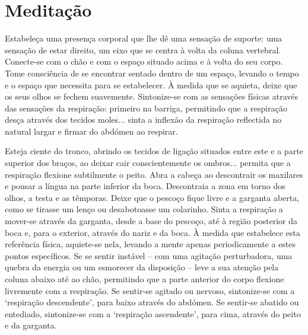 
\chapter{Meditação}


Estabeleça uma presença corporal que lhe dê uma sensação de suporte: uma sensação de estar direito, um eixo que se centra à volta da coluna vertebral. Conecte-se com o chão e com o espaço situado acima e à volta do seu corpo. Tome consciência de se encontrar sentado dentro de um espaço, levando o tempo e o espaço que necessita para se estabelecer. À medida que se aquieta, deixe que os seus olhos se fechem suavemente. Sintonize-se com as sensações físicas através das sensações da respiração: primeiro na barriga, permitindo que a respiração desça através dos tecidos moles... sinta a inflexão da respiração reflectida no natural largar e firmar do abdómen ao respirar.

Esteja ciente do tronco, abrindo os tecidos de ligação situados entre este e a parte superior dos braços, ao deixar cair conscientemente os ombros... permita que a respiração flexione subtilmente o peito. Abra a cabeça ao descontrair os maxilares e pousar a língua na parte inferior da boca. Descontraia a zona em torno dos olhos, a testa e as têmporas. Deixe que o pescoço fique livre e a garganta aberta, como se tirasse um lenço ou desabotoasse um colarinho. Sinta a respiração a mover-se através da garganta, desde a base do pescoço, até à região posterior da boca e, para o exterior, através do nariz e da boca. À medida que estabelece esta referência física, aquiete-se nela, levando a mente apenas periodicamente a estes pontos específicos. Se se sentir instável -- com uma agitação perturbadora, uma quebra da energia ou um esmorecer da disposição -- leve a sua atenção pela coluna abaixo até ao chão, permitindo que a parte anterior do corpo flexione livremente com a respiração. Se sentir-se agitado ou nervoso, sintonize-se com a `respiração descendente', para baixo através do abdómen. Se sentir-se abatido ou entediado, sintonize-se com a `respiração ascendente', para cima, através do peito e da garganta.

